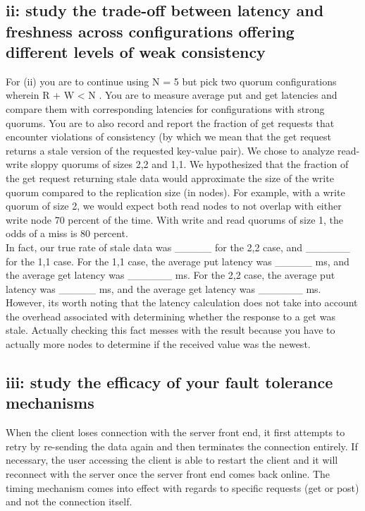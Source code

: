 \documentclass[12pt,letter]{article}
\begin{document}
\onehalfspacing
\section*{}
\subsection*{ii: study the trade-off between latency and freshness across configurations offering different levels of weak consistency}
For (ii) you are to continue using N = 5 but pick two quorum configurations wherein R + W < N . You are to measure average put and get latencies and compare them with corresponding latencies for configurations with strong quorums. You are to also record and report the fraction of get requests that encounter violations of consistency (by which we mean that the get request returns a stale version of the requested key-value pair).
We chose to analyze read-write sloppy quorums of sizes 2,2 and 1,1. We hypothesized that the fraction of the get request returning stale data would approximate the size of the write quorum compared to the replication size (in nodes). For example, with a write quorum of size 2, we would expect both read nodes to not overlap with either write node 70 percent of the time. With write and read quorums of size 1, the odds of a miss is 80 percent.\\

\onehalfspacing
In fact, our true rate of stale data was _____ for the 2,2 case, and ______ for the 1,1 case. For the 1,1 case, the average put latency was _____ ms, and the average get latency was ______ ms. For the 2,2 case, the average put latency was _____ ms, and the average get latency was ______ ms. However, its worth noting that the latency calculation does not take into account the overhead associated with determining whether the response to a get was stale. Actually checking this fact messes with the result because you have to actually more nodes to determine if the received value was the newest. 

\subsection*{iii: study the efficacy of your fault tolerance mechanisms}
When the client loses connection with the server front end, it first attempts to retry by re-sending the data again and then terminates the connection entirely. If necessary, the user accessing the client is able to restart the client and it will reconnect with the server once the server front end comes back online. The timing mechanism comes into effect with regards to specific requests (get or post) and not the connection itself.\\
\end{document}
